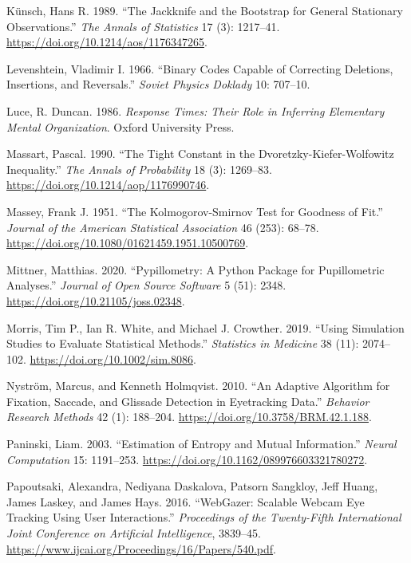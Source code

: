 \documentclass[
]{article}
\newlength{\cslhangindent}
\newenvironment{CSLReferences}[2] %
 {\begin{list}{}{%
  \setlength{\itemindent}{0pt}
  \setlength{\leftmargin}{0pt}
  \setlength{\parsep}{0pt}
  \ifodd #1
   \setlength{\leftmargin}{\cslhangindent}
   \setlength{\itemindent}{-1\cslhangindent}
  \fi
  \setlength{\itemsep}{#2\baselineskip}}}
 {\end{list}}
\begin{document}
\begin{CSLReferences}{1}{1}
Künsch, Hans R. 1989. {``The Jackknife and the Bootstrap for General
Stationary Observations.''} \emph{The Annals of Statistics} 17 (3):
1217--41. \url{https://doi.org/10.1214/aos/1176347265}.

Levenshtein, Vladimir I. 1966. {``Binary Codes Capable of Correcting
Deletions, Insertions, and Reversals.''} \emph{Soviet Physics Doklady}
10: 707--10.

Luce, R. Duncan. 1986. \emph{Response Times: Their Role in Inferring
Elementary Mental Organization}. Oxford University Press.

Massart, Pascal. 1990. {``The Tight Constant in the
Dvoretzky-Kiefer-Wolfowitz Inequality.''} \emph{The Annals of
Probability} 18 (3): 1269--83.
\url{https://doi.org/10.1214/aop/1176990746}.

Massey, Frank J. 1951. {``The Kolmogorov-Smirnov Test for Goodness of
Fit.''} \emph{Journal of the American Statistical Association} 46 (253):
68--78. \url{https://doi.org/10.1080/01621459.1951.10500769}.

Mittner, Matthias. 2020. {``Pypillometry: A Python Package for
Pupillometric Analyses.''} \emph{Journal of Open Source Software} 5
(51): 2348. \url{https://doi.org/10.21105/joss.02348}.

Morris, Tim P., Ian R. White, and Michael J. Crowther. 2019. {``Using
Simulation Studies to Evaluate Statistical Methods.''} \emph{Statistics
in Medicine} 38 (11): 2074--102. \url{https://doi.org/10.1002/sim.8086}.

Nyström, Marcus, and Kenneth Holmqvist. 2010. {``An Adaptive Algorithm
for Fixation, Saccade, and Glissade Detection in Eyetracking Data.''}
\emph{Behavior Research Methods} 42 (1): 188--204.
\url{https://doi.org/10.3758/BRM.42.1.188}.

Paninski, Liam. 2003. {``Estimation of Entropy and Mutual
Information.''} \emph{Neural Computation} 15: 1191--253.
\url{https://doi.org/10.1162/089976603321780272}.

Papoutsaki, Alexandra, Nediyana Daskalova, Patsorn Sangkloy, Jeff Huang,
James Laskey, and James Hays. 2016. {``WebGazer: Scalable Webcam Eye
Tracking Using User Interactions.''} \emph{Proceedings of the
Twenty-Fifth International Joint Conference on Artificial Intelligence},
3839--45. \url{https://www.ijcai.org/Proceedings/16/Papers/540.pdf}.


\end{CSLReferences}
\end{document}
